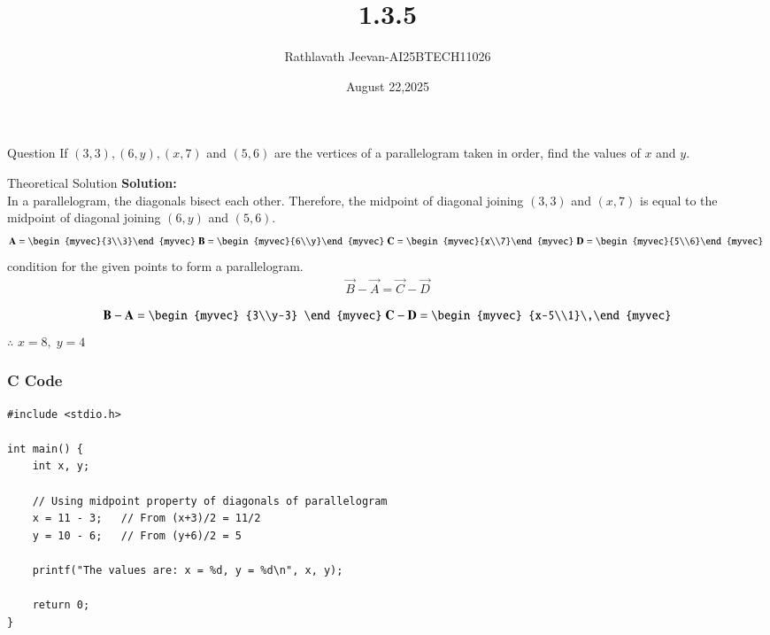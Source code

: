 \documentclass{beamer}
\title %
{1.3.5}
\date{August 22,2025}
\author %
{Rathlavath Jeevan-AI25BTECH11026}
\begin{document}
\frame{\titlepage}
\begin{frame}{Question}
If $(3,3), (6,y), (x,7)$ and $(5,6)$ are the vertices of a parallelogram taken in order, 
find the values of $x$ and $y$.
\end{frame}



\begin{frame}{Theoretical Solution}
\textbf{Solution:} \\
In a parallelogram, the diagonals bisect each other. Therefore, the midpoint of diagonal 
joining $(3,3)$ and $(x,7)$ is equal to the midpoint of diagonal joining $(6,y)$ and $(5,6)$.
\begin{align}
    \vec{A}=\begin{myvec}{3\\3}\end{myvec}\;
    \vec{B}=\begin{myvec}{6\\y}\end{myvec}\;
    \vec{C}=\begin{myvec}{x\\7}\end{myvec}\;         \vec{D}=\begin{myvec}{5\\6}\end{myvec}\
\end{align}
condition for the given points to form a parallelogram.\\
\begin{align}
    \vec{B}-\vec{A}=\vec{C}-\vec{D}
\end{align}


\begin{align}
    \vec{B}-\vec{A}=\begin{myvec}
        {3\\y-3}
    \end{myvec} \;
    \vec{C}-\vec{D}=\begin{myvec}
        {x-5\\1}\
    \end{myvec}
\end{align}
$\therefore$ $x=8, \; y=4$  
\end{frame}




\begin{frame}[fragile]
    \frametitle{C Code }

    \begin{lstlisting}
#include <stdio.h>

int main() {
    int x, y;

    // Using midpoint property of diagonals of parallelogram
    x = 11 - 3;   // From (x+3)/2 = 11/2
    y = 10 - 6;   // From (y+6)/2 = 5

    printf("The values are: x = %d, y = %d\n", x, y);

    return 0;
}

    \end{lstlisting}
\end{frame}
\end{document}
